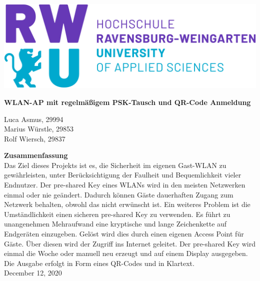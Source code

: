 \documentclass[a4paper,11pt,singlespacing]{article}
\begin{document}
    
 \setlength{\parindent}{0ex}
    	
\begin{titlepage}
    \begin{center}
    \includegraphics[scale=0.3]{rwu_logo_hor-lila-cyan_rgb_0}
        \vspace*{1.5cm}
        
        \Huge
        \textbf{WLAN-AP mit regelmäßigem PSK-Tausch und QR-Code Anmeldung}
            
        \vspace{1.4cm}
        \normalsize
        Luca Asmus, 29994\\ Marius Würstle, 29853\\Rolf Wiersch, 29837
            
        \vspace{1.0cm}
        
          \normalsize
        \textbf{Zusammenfassung}\\
    	Das Ziel dieses Projekts ist es, die Sicherheit im eigenen Gast-WLAN zu gewährleisten, unter Berücksichtigung der Faulheit und Bequemlichkeit vieler Endnutzer. Der pre-shared Key eines WLANs wird in den meisten Netzwerken einmal oder nie geändert. Dadurch können Gäste dauerhaften Zugang zum Netzwerk behalten, obwohl das nicht erwünscht ist. Ein weiteres Problem ist die Umständlichkeit einen sicheren pre-shared Key zu verwenden. Es führt zu unangenehmen Mehraufwand eine kryptische und lange Zeichenkette auf Endgeräten einzugeben. Gelöst wird dies durch einen eigenen Access Point für Gäste. Über diesen wird der Zugriff ins Internet geleitet. Der pre-shared Key wird einmal die Woche oder manuell neu erzeugt und auf einem Display ausgegeben. Die Ausgabe erfolgt in Form eines QR-Codes und in Klartext.   \\
        
        \vspace{2.0cm}
        December 12, 2020
        
        \vspace{0.8cm}
          
            
    \end{center}
\end{titlepage}
    	
\end{document}
